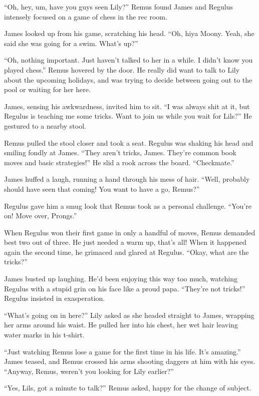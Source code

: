 \documentclass[12pt,twoside,openright]{memoir}
\begin{document}
``Oh, hey, um, have you guys seen Lily?'' Remus found James and Regulus intensely focused on a game of chess in the rec room. 

James looked up from his game, scratching his head. ``Oh, hiya Moony. Yeah, she said she was going for a swim. What's up?''

``Oh, nothing important. Just haven't talked to her in a while. I didn't know you played chess.'' Remus hovered by the door. He really did want to talk to Lily about the upcoming holidays, and was trying to decide between going out to the pool or waiting for her here. 

James, sensing his awkwardness, invited him to sit. ``I was always shit at it, but Regulus is teaching me some tricks. Want to join us while you wait for Lils?'' He gestured to a nearby stool. 

Remus pulled the stool closer and took a seat. Regulus was shaking his head and smiling fondly at James. ``They aren't tricks, James. They're common book moves and basic strategies!'' He slid a rook across the board. ``Checkmate.''

James huffed a laugh, running a hand through his mess of hair. ``Well, probably should have seen that coming! You want to have a go, Remus?''

Regulus gave him a smug look that Remus took as a personal challenge. ``You're on! Move over, Prongs.''

When Regulus won their first game in only a handful of moves, Remus demanded best two out of three. He just needed a warm up, that's all! When it happened again the second time, he grimaced and glared at Regulus. ``Okay, what are the tricks?''

James busted up laughing. He'd been enjoying this way too much, watching Regulus with a stupid grin on his face like a proud papa. ``They're not tricks!'' Regulus insisted in exasperation. 

``What's going on in here?'' Lily asked as she headed straight to James, wrapping her arms around his waist. He pulled her into his chest, her wet hair leaving water marks in his t-shirt. 

``Just watching Remus lose a game for the first time in his life. It's amazing.'' James teased, and Remus crossed his arms shooting daggers at him with his eyes. ``Anyway, Remus, weren't you looking for Lily earlier?'' 

``Yes, Lils, got a minute to talk?'' Remus asked, happy for the change of subject.
\end{document}
